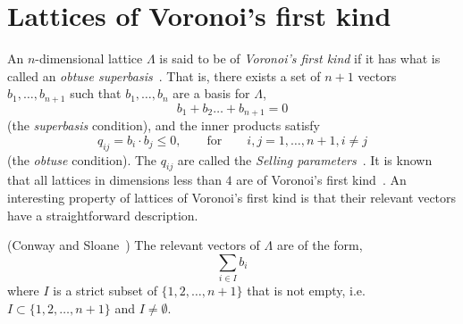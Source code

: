 \documentclass[final,leqno]{siamltex}
\begin{document}
\section{Lattices of Voronoi's first kind} \label{sec:latt-voron-first}

An $n$-dimensional lattice $\Lambda$ is said to be of \emph{Voronoi's first kind} if it has what is called an \emph{obtuse superbasis}~\cite{ConwaySloane1992_voronoi_lattice_3d_obtuse_superbases}.  That is, there exists a set of $n+1$ vectors $b_1,\dots,b_{n+1}$ such that $b_1,\dots,b_n$ are a basis for $\Lambda$,
\begin{equation}\label{eq:superbasecond}
b_1 + b_2 \dots + b_{n+1} = 0
\end{equation}
(the \emph{superbasis} condition), and the inner products satisfy
\begin{equation}\label{eq:obtusecond}
q_{ij} = b_i \cdot b_j \leq 0, \qquad \text{for} \qquad i,j = 1,\dots,n+1, i \neq j
\end{equation}
(the \emph{obtuse} condition).  The $q_{ij}$ are called the \emph{Selling parameters}~\cite{Selling1874}.  It is known that all lattices in dimensions less than $4$ are of Voronoi's first kind~\cite{ConwaySloane1992_voronoi_lattice_3d_obtuse_superbases}.  An interesting property of lattices of Voronoi's first kind is that their relevant vectors have a straightforward description.

\begin{theorem} \label{thm:revvecssuperbase} (Conway and Sloane~\cite[Theorem~3]{ConwaySloane1992_voronoi_lattice_3d_obtuse_superbases})
The relevant vectors of $\Lambda$ are of the form,
\[
\sum_{i \in I} b_i
\]
where $I$ is a strict subset of $\{1, 2, \dots, n+1\}$ that is not empty, i.e. $I \subset \{1, 2, \dots, n+1\}$ and $I \neq \emptyset$.
\end{theorem}  
 
\end{document}
